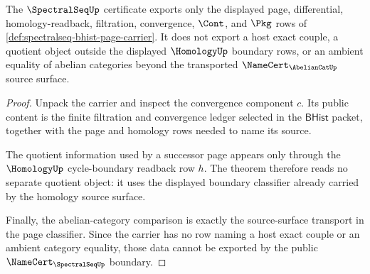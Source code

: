 \begin{theorem}
\label{thm:spectralseq-convergence-boundary}
The $\SpectralSeqUp$ certificate exports only the displayed page, differential,
homology-readback, filtration, convergence, $\Cont$, and $\Pkg$ rows of
\autoref{def:spectralseq-bhist-page-carrier}. It does not export a host exact
couple, a quotient object outside the displayed $\HomologyUp$ boundary rows,
or an ambient equality of abelian categories beyond the transported
$\NameCert_{\AbelianCatUp}$ source surface.
\end{theorem}
\begin{proof}
Unpack the carrier and inspect the convergence component $c$. Its public
content is the finite filtration and convergence ledger selected in the
$\mathsf{BHist}$ packet, together with the page and homology rows needed to
name its source.

The quotient information used by a successor page appears only through the
$\HomologyUp$ cycle-boundary readback row $h$. The theorem therefore reads no
separate quotient object: it uses the displayed boundary classifier already
carried by the homology source surface.

Finally, the abelian-category comparison is exactly the source-surface
transport in the page classifier. Since the carrier has no row naming a host
exact couple or an ambient category equality, those data cannot be exported by
the public $\NameCert_{\SpectralSeqUp}$ boundary.
\end{proof}

